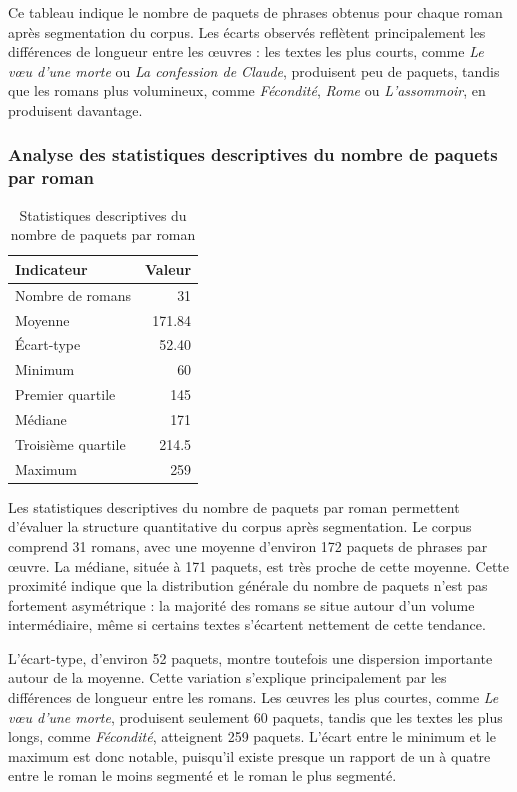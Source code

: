 \documentclass{article}
\begin{document}
Ce tableau indique le nombre de paquets de phrases obtenus pour chaque roman après segmentation du corpus. Les écarts observés reflètent principalement les différences de longueur entre les œuvres : les textes les plus courts, comme \textit{Le vœu d'une morte} ou \textit{La confession de Claude}, produisent peu de paquets, tandis que les romans plus volumineux, comme \textit{Fécondité}, \textit{Rome} ou \textit{L'assommoir}, en produisent davantage.

\subsubsection{Analyse des statistiques descriptives du nombre de paquets par roman}
\begin{table}[H]
\centering
\caption{Statistiques descriptives du nombre de paquets par roman}
\begin{tabular}{lr}
\toprule
\textbf{Indicateur} & \textbf{Valeur} \\
\midrule
Nombre de romans & 31 \\
Moyenne & 171.84 \\
Écart-type & 52.40 \\
Minimum & 60 \\
Premier quartile & 145 \\
Médiane & 171 \\
Troisième quartile & 214.5 \\
Maximum & 259 \\
\bottomrule
\end{tabular}
\end{table}


Les statistiques descriptives du nombre de paquets par roman permettent d'évaluer la structure quantitative du corpus après segmentation. Le corpus comprend 31 romans, avec une moyenne d'environ 172 paquets de phrases par œuvre. La médiane, située à 171 paquets, est très proche de cette moyenne. Cette proximité indique que la distribution générale du nombre de paquets n'est pas fortement asymétrique : la majorité des romans se situe autour d'un volume intermédiaire, même si certains textes s'écartent nettement de cette tendance.

L'écart-type, d'environ 52 paquets, montre toutefois une dispersion importante autour de la moyenne. Cette variation s'explique principalement par les différences de longueur entre les romans. Les œuvres les plus courtes, comme \textit{Le vœu d'une morte}, produisent seulement 60 paquets, tandis que les textes les plus longs, comme \textit{Fécondité}, atteignent 259 paquets. L'écart entre le minimum et le maximum est donc notable, puisqu'il existe presque un rapport de un à quatre entre le roman le moins segmenté et le roman le plus segmenté.
\end{document}
